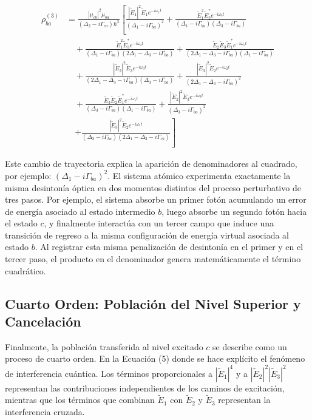 \documentclass[12pt,a4paper]{article}
\begin{document}
\begin{equation}
\begin{aligned}
\rho_{ba}^{(3)} &= \frac{|\mu_{cb}|^2 \mu_{ba}}{(\Delta_2 - i\Gamma_{ca})\hbar^3} \left[ \frac{|\tilde{E}_1|^2 \tilde{E}_1 e^{-i\omega_1 t}}{(\Delta_1 - i\Gamma_{ba})^2} + \frac{\tilde{E}_1^2 \tilde{E}_2^* e^{-i\omega_3 t}}{(\Delta_1 - i\Gamma_{ba})(\Delta_3 - i\Gamma_{ba})} \right. \\
&\quad + \frac{\tilde{E}_1^2 \tilde{E}_3^* e^{-i\omega_2 t}}{(\Delta_1 - i\Gamma_{ba})(2\Delta_1 - \Delta_3 - i\Gamma_{ba})} + \frac{\tilde{E}_2 \tilde{E}_3 \tilde{E}_1^* e^{-i\omega_1 t}}{(2\Delta_1 - \Delta_3 - i\Gamma_{ba})(\Delta_1 - i\Gamma_{ba})} \\
&\quad + \frac{|\tilde{E}_2|^2 \tilde{E}_3 e^{-i\omega_3 t}}{(2\Delta_1 - \Delta_3 - i\Gamma_{ba})(\Delta_3 - i\Gamma_{ba})} + \frac{|\tilde{E}_3|^2 \tilde{E}_2 e^{-i\omega_2 t}}{(2\Delta_1 - \Delta_3 - i\Gamma_{ba})^2} \\
&\quad + \frac{\tilde{E}_3 \tilde{E}_2 \tilde{E}_1^* e^{-i\omega_1 t}}{(\Delta_3 - i\Gamma_{ba})(\Delta_1 - i\Gamma_{ba})} + \frac{|\tilde{E}_2|^2 \tilde{E}_3 e^{-i\omega_3 t}}{(\Delta_3 - i\Gamma_{ba})^2} \\
&\quad \left. + \frac{|\tilde{E}_3|^2 \tilde{E}_2 e^{-i\omega_2 t}}{(\Delta_3 - i\Gamma_{ba})(2\Delta_1 - \Delta_3 - i\Gamma_{cb})} \right]
\end{aligned} \tag{4b}
\end{equation}

Este cambio de trayectoria explica la aparición de denominadores al cuadrado, por ejemplo: $(\Delta_1 - i\Gamma_{ba})^2$. El sistema atómico experimenta exactamente la misma desintonía óptica en dos momentos distintos del proceso perturbativo de tres pasos. Por ejemplo, el sistema absorbe un primer fotón acumulando un error de energía asociado al estado intermedio $b$, luego absorbe un segundo fotón hacia el estado $c$, y finalmente interactúa con un tercer campo que induce una transición de regreso a la misma configuración de energía virtual asociada al estado $b$. Al registrar esta misma penalización de desintonía en el primer y en el tercer paso, el producto en el denominador genera matemáticamente el término cuadrático.

\subsection*{Cuarto Orden: Población del Nivel Superior y Cancelación}
Finalmente, la población transferida al nivel excitado $c$ se describe como un proceso de cuarto orden. En la Ecuación (5) donde se hace explícito el fenómeno de interferencia cuántica. Los términos proporcionales a $|\tilde{E}_1|^4$ y a $|\tilde{E}_2|^2|\tilde{E}_3|^2$ representan las contribuciones independientes de los caminos de excitación, mientras que los términos que combinan $\tilde{E}_1$ con $\tilde{E}_2$ y $\tilde{E}_3$ representan la interferencia cruzada. 
\end{document}
